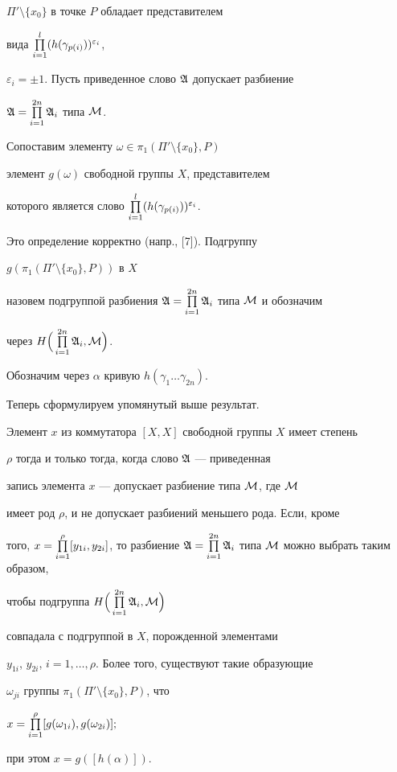 $\Pi'\setminus \{x_0\}$ в точке $P$ обладает представителем


вида $\prod\limits_{i=1}^l (h(\gamma_{p(i)}))^{\varepsilon_i}$,


$\varepsilon_i=\pm 1$. Пусть приведенное слово $\frak A$ допускает разбиение 


$\frak A=\prod\limits_{i=1}^{2n}\frak A_i$ типа $\cal M$.


Сопоставим элементу $\omega\in\pi_1(\Pi'\setminus\{x_0\},P)$


элемент $g(\omega)$ свободной группы $X$, представителем


которого является слово $\prod\limits_{i=1}^l(h(\gamma_{p(i)}))^{\varepsilon_i}$.


Это определение корректно (напр., [7]). Подгруппу


$g(\pi_1(\Pi'\setminus\{x_0\},P))$ в $X$


назовем подгруппой разбиения $\frak A=\PL_{i=1}^{2n}


\frak A_i$ типа $\cal M$ и обозначим


через $H\Big(\prod\limits_{i=1}^{2n}\frak A_i,\cal M\Big)$.


Обозначим через $\alpha$ кривую $h(\gamma_1 \dotsc\gamma_{2n})$.


Теперь сформулируем упомянутый выше результат.





\begin{thm}


Элемент $x$ из коммутатора $[X,X]$ свободной группы $X$ имеет степень


$\rho $ тогда и только тогда, когда слово $\frak A$ --- приведенная 


запись элемента $x$ --- допускает разбиение типа $\cal M$, где $\cal M$


имеет род $\rho$, и не допускает разбиений меньшего рода. Если, кроме 


того, $x=\PL_{i=1}^\rho[y_{1i},y_{2i}]$, то разбиение $\frak A=


\PL_{i=1}^{2n}\frak A_i$ типа $\cal M$ можно выбрать таким образом, 


чтобы подгруппа $H\Big(\prod\limits_{i=1}^{2n}\frak A_i,\cal M\Big)$


совпадала с подгруппой в $X$, порожденной элементами 


$y_{1i}$, $y_{2i}$, $i=1,\dotsc,\rho$. Более того, существуют такие образующие


$\omega_{ji}$ группы $\pi_1(\Pi'\setminus \{x_0\},P)$, что


$x=\prod\limits_{i=1}^\rho[g(\omega_{1i}),g(\omega_{2i})];$


при этом $x=g([h(\alpha)])$.


\end{thm}





